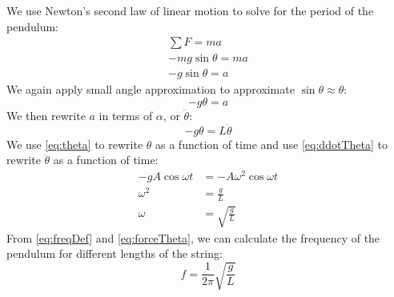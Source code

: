 \documentclass[article, 12pt]{article}
\begin{document}
\begin{enumerate}[1)]
    We use Newton's second law of linear motion to solve for the period of the pendulum:
    \begin{align}        \label{eq:forceEquality}
        \sum F = ma \nonumber \\
        -mg\sin{\theta} = ma \nonumber \\
        -g\sin{\theta} = a
    \end{align}
    We again apply small angle approximation to approximate $\sin{\theta} \approx \theta$:
    \begin{equation}        \label{eq:forceSmallAngleApprox}
        -g\theta = a
    \end{equation}
    We then rewrite $a$ in terms of $\alpha$, or $\ddot{\theta}$:
    \begin{equation}        \label{eq:forceDDotTheta}
        -g\theta = L\ddot{\theta}
    \end{equation}
    We use \autoref{eq:theta} to rewrite $\theta$ as a function of time and use \autoref{eq:ddotTheta} to rewrite $\ddot{\theta}$ as a function of time:
    \begin{align}        \label{eq:forceTheta}
        -gA\cos{\omega t} &= -A\omega^2\cos{\omega t} \nonumber \\
        \omega^2 &= \frac{g}{L} \nonumber \\
        \omega &= \sqrt{\frac{g}{L}}
    \end{align}
    From \autoref{eq:freqDef} and \autoref{eq:forceTheta}, we can calculate the frequency of the pendulum for different lengths of the string:
    \begin{equation}
        f = \frac{1}{2\pi}\sqrt{\frac{g}{L}}
        \label{eq:forceFreq}
    \end{equation}
\end{enumerate}
\end{document}
